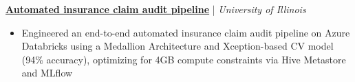 \documentclass[10pt]{article}
\begin{document}



\noindent
\textbf{\href{https://www.linkedin.com/feed/update/urn:li:activity:7429979052737974272/?originTrackingId=XCjPlyi3K9LDlPz/y67LDQ\%3D\%3D}{Automated insurance claim audit pipeline}} | 
\emph{University of Illinois}
\vspace{-5pt}
\begin{itemize}[left=0pt, itemsep=0pt]
    \item Engineered an end-to-end automated insurance claim audit pipeline on Azure Databricks using a Medallion Architecture and Xception-based CV model (94\% accuracy), optimizing for 4GB compute constraints via Hive Metastore and MLflow
\end{itemize}
\end{document}

